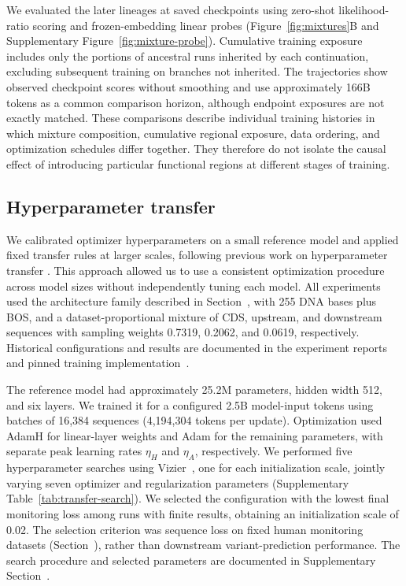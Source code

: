 \documentclass[a4paper,num-refs]{oup-contemporary}
\begin{document}
We evaluated the later lineages at saved checkpoints using zero-shot
likelihood-ratio scoring and frozen-embedding linear probes
(Figure~\ref{fig:mixtures}B and Supplementary
Figure~\ref{fig:mixture-probe}).
Cumulative training exposure includes only the portions of ancestral
runs inherited by each continuation, excluding subsequent training
on branches not inherited. The trajectories show observed checkpoint
scores without smoothing and use approximately 166B tokens as a
common comparison horizon, although endpoint exposures are not
exactly matched. These comparisons describe individual training
histories in which mixture composition, cumulative regional exposure,
data ordering, and optimization schedules differ together.
They therefore do not isolate the causal effect of introducing
particular functional regions at different stages of training.

\subsection{Hyperparameter transfer}\label{methods:transfer}

We calibrated optimizer hyperparameters on a small reference model
and applied fixed transfer rules at larger scales, following previous
work on hyperparameter transfer
\citep{yang2021transfer,mlodozeniec2025completed}.
This approach allowed us to use a consistent optimization procedure
across model sizes without independently tuning each model.
All experiments used the architecture family described in
Section~, with 255 DNA bases plus BOS,
and a dataset-proportional mixture of CDS, upstream, and downstream
sequences with sampling weights 0.7319, 0.2062, and 0.0619,
respectively. Historical configurations and results are documented
in the experiment reports and pinned training
implementation~\citep{marindna109,marin4251,marintransfercode}.

The reference model had approximately 25.2M parameters, hidden width
512, and six layers. We trained it for a configured 2.5B model-input
tokens using batches of 16,384 sequences (4,194,304 tokens per update).
Optimization used AdamH for linear-layer weights and Adam for the
remaining parameters, with separate peak learning rates $\eta_H$ and
$\eta_A$, respectively.
We performed five hyperparameter searches using
Vizier~\citep{vizierrepo}, one for each initialization scale, jointly
varying seven optimizer and regularization parameters
(Supplementary Table~\ref{tab:transfer-search}).
We selected the configuration with the lowest final monitoring loss
among runs with finite results, obtaining an initialization scale of
0.02. The selection criterion was sequence loss on fixed human
monitoring datasets (Section~), rather than
downstream variant-prediction performance.
The search procedure and selected parameters are documented in
Supplementary Section~.
\end{document}
